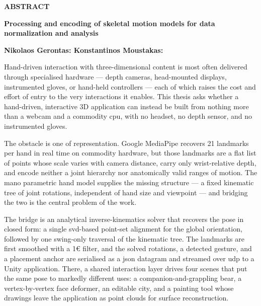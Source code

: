 \begin{center}  \Large{\textbf{ABSTRACT}}  \end{center}
\begin{center}  \Large{\textbf{Processing and encoding of skeletal motion models for
data normalization and analysis}}  \end{center}
\vspace{3pt}
\begin{center}  \large{\textbf{Nikolaos Gerontas: \hspace{50pt} Konstantinos Moustakas:}}  \end{center}
\vspace{10pt}
\noindent

Hand-driven interaction with three-dimensional content is most often
delivered through specialised hardware --- depth cameras, head-mounted
displays, instrumented gloves, or hand-held controllers --- each of which
raises the cost and effort of entry to the very interactions it enables.
This thesis asks whether a hand-driven, interactive 3D application can
instead be built from nothing more than a webcam and a commodity
\acrshort{cpu}, with no headset, no depth sensor, and no instrumented gloves.

The obstacle is one of representation. Google MediaPipe recovers 21
landmarks per hand in real time on commodity hardware, but those landmarks
are a flat list of points whose scale varies with camera distance, carry
only wrist-relative depth, and encode neither a joint hierarchy nor
anatomically valid ranges of motion. The \acrshort{mano} parametric hand
model supplies the missing structure --- a fixed kinematic tree of joint
rotations, independent of hand size and viewpoint --- and bridging the two
is the central problem of the work.

The bridge is an analytical inverse-kinematics solver that recovers the
pose in closed form: a single \acrshort{svd}-based point-set alignment for
the global orientation, followed by one swing-only traversal of the
kinematic tree. The landmarks are first smoothed with a 1\euro{} filter,
and the solved rotations, a detected gesture, and a placement anchor are
serialised as a \acrshort{json} datagram and streamed over \acrshort{udp}
to a Unity application. There, a shared interaction layer drives four scenes
that put the same pose to markedly different uses: a companion-and-grappling
bear, a vertex-by-vertex face deformer, an editable city, and a painting
tool whose drawings leave the application as point clouds for surface
reconstruction.

